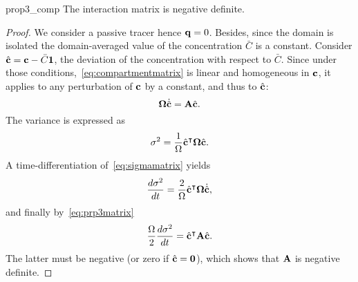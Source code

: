 \begin{propertybis}{prop3_comp} \label{prop3bis_comp}
	The interaction matrix is negative definite.
\end{propertybis}
\begin{proof}
	We consider a passive tracer hence $\mathbf q = 0$. Besides, since the domain is isolated the domain-averaged value of the concentration $\bar C$ is a constant.
	Consider $\hat{\mathbf c} = \mathbf c - \bar C \mathbf 1$, the deviation of the concentration with respect to $\bar C$. Since under those conditions,~\eqref{eq:compartmentmatrix} is linear and homogeneous in $\mathbf c$, it applies to any perturbation of $\mathbf c$ by a constant, and thus to $\hat{\mathbf c}$:
	\begin{equation} \label{eq:prp3matrix}
		\boldsymbol \Omega \dot{\hat{\mathbf c}} = \mathbf A \hat{\mathbf c}.
	\end{equation}
	The variance is expressed as
	\begin{equation}\label{eq:sigmamatrix}
		\sigma^2 = \frac{1}{\Omega} \hat{\mathbf c}^\intercal \boldsymbol \Omega \hat{\mathbf c}.
	\end{equation}
	A time-differentiation of~\eqref{eq:sigmamatrix} yields
	\begin{equation}
		\frac{d \sigma^2}{dt} = \frac{2}{\Omega} \hat{\mathbf c}^\intercal \boldsymbol \Omega \dot{\hat{\mathbf c}},
	\end{equation}
	and finally by~\eqref{eq:prp3matrix}
	\begin{equation}
		\frac{\Omega}{2} \frac{d \sigma^2}{dt} = \hat{\mathbf c}^\intercal \mathbf A \hat{\mathbf c}.
	\end{equation}
	The latter must be negative (or zero if $\hat{\mathbf c} = \mathbf 0$), which shows that $\mathbf A$ is negative definite.
\end{proof}